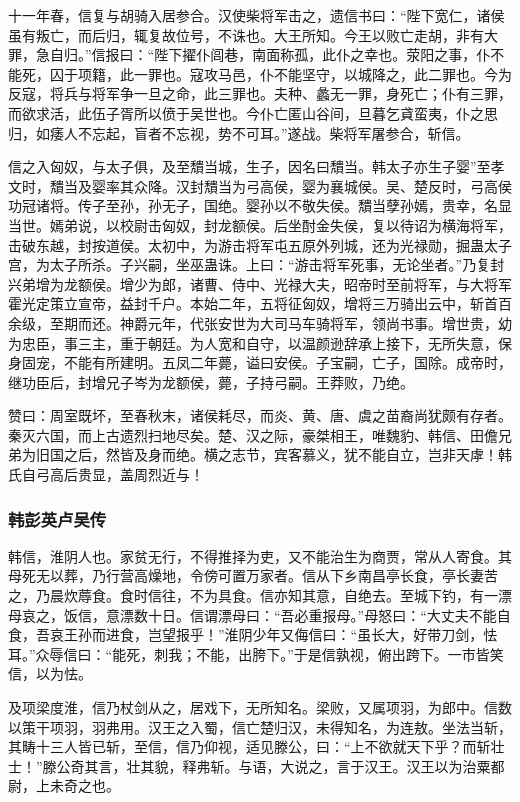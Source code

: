 \documentclass[]{article}
\begin{document}
十一年春，信复与胡骑入居参合。汉使柴将军击之，遗信书曰：``陛下宽仁，诸侯虽有叛亡，而后归，辄复故位号，不诛也。大王所知。今王以败亡走胡，非有大罪，急自归。''信报曰：``陛下擢仆闾巷，南面称孤，此仆之幸也。荥阳之事，仆不能死，囚于项籍，此一罪也。寇攻马邑，仆不能坚守，以城降之，此二罪也。今为反寇，将兵与将军争一旦之命，此三罪也。夫种、蠡无一罪，身死亡；仆有三罪，而欲求活，此伍子胥所以偾于吴世也。今仆亡匿山谷间，旦暮乞貣蛮夷，仆之思归，如痿人不忘起，盲者不忘视，势不可耳。''遂战。柴将军屠参合，斩信。

信之入匈奴，与太子俱，及至穨当城，生子，因名曰穨当。韩太子亦生子婴''至孝文时，穨当及婴率其众降。汉封穨当为弓高侯，婴为襄城侯。吴、楚反时，弓高侯功冠诸将。传子至孙，孙无子，国绝。婴孙以不敬失侯。穨当孽孙嫣，贵幸，名显当世。嫣弟说，以校尉击匈奴，封龙额侯。后坐酎金失侯，复以待诏为横海将军，击破东越，封按道侯。太初中，为游击将军屯五原外列城，还为光禄勋，掘蛊太子宫，为太子所杀。子兴嗣，坐巫蛊诛。上曰：``游击将军死事，无论坐者。''乃复封兴弟增为龙额侯。增少为郎，诸曹、侍中、光禄大夫，昭帝时至前将军，与大将军霍光定策立宣帝，益封千户。本始二年，五将征匈奴，增将三万骑出云中，斩首百余级，至期而还。神爵元年，代张安世为大司马车骑将军，领尚书事。增世贵，幼为忠臣，事三主，重于朝廷。为人宽和自守，以温颜逊辞承上接下，无所失意，保身固宠，不能有所建明。五凤二年薨，谥曰安侯。子宝嗣，亡子，国除。成帝时，继功臣后，封增兄子岑为龙额侯，薨，子持弓嗣。王莽败，乃绝。

赞曰：周室既坏，至春秋末，诸侯耗尽，而炎、黄、唐、虞之苗裔尚犹颇有存者。秦灭六国，而上古遗烈扫地尽矣。楚、汉之际，豪桀相王，唯魏豹、韩信、田儋兄弟为旧国之后，然皆及身而绝。横之志节，宾客慕义，犹不能自立，岂非天虖！韩氏自弓高后贵显，盖周烈近与！

\hypertarget{header-n3523}{%
\subsubsection{韩彭英卢吴传}\label{header-n3523}}

韩信，淮阴人也。家贫无行，不得推择为吏，又不能治生为商贾，常从人寄食。其母死无以葬，乃行营高燥地，令傍可置万家者。信从下乡南昌亭长食，亭长妻苦之，乃晨炊蓐食。食时信往，不为具食。信亦知其意，自绝去。至城下钓，有一漂母哀之，饭信，意漂数十日。信谓漂母曰：``吾必重报母。''母怒曰：``大丈夫不能自食，吾哀王孙而进食，岂望报乎！''淮阴少年又侮信曰：``虽长大，好带刀剑，怯耳。''众辱信曰：``能死，刺我；不能，出胯下。''于是信孰视，俯出跨下。一市皆笑信，以为怯。

及项梁度淮，信乃杖剑从之，居戏下，无所知名。梁败，又属项羽，为郎中。信数以策干项羽，羽弗用。汉王之入蜀，信亡楚归汉，未得知名，为连敖。坐法当斩，其畴十三人皆已斩，至信，信乃仰视，适见滕公，曰：``上不欲就天下乎？而斩壮士！''滕公奇其言，壮其貌，释弗斩。与语，大说之，言于汉王。汉王以为治粟都尉，上未奇之也。
\end{document}
